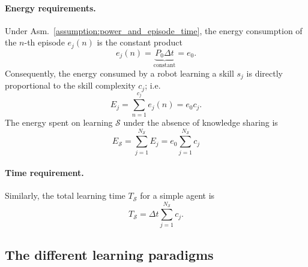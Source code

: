 \paragraph{Energy requirements.}
Under Asm.~\ref{assumption:power_and_episode_time}, the energy consumption of the $n$-th episode $e_j(n)$ is the constant product
\begin{equation}\label{eq:energy_per_episode}
	e_j(n) = \underbrace{P_0 \Delta t}_{\text{constant}} = e_0.
\end{equation}
Consequently, the energy consumed by a robot learning a skill $ s_j $ is directly proportional to the skill complexity $c_j$; i.e.
\begin{equation}\label{eq:energy_per_skill}
	E_j =\sum_{n=1}^{c_j} e_j(n) = e_0c_j.
\end{equation}
The energy spent on learning $\mathcal{S}$ under the absence of knowledge sharing is
\begin{equation}\label{eq:total_energy}
	E_{\mathcal{S}} = \sum_{j=1}^{{N_{\mathcal{S}}}} E_j = e_0 \sum_{j=1}^{{N_{\mathcal{S}}}} c_j%
\end{equation}
\paragraph{Time requirement.} Similarly, the total learning time $T_{\mathcal{S}}$ for a simple agent is
\begin{equation}\label{eq:total_time}
	T_{\mathcal{S}} = \Delta t \sum_{j=1}^{{N_{\mathcal{S}}}} c_j.
\end{equation}

\subsection{The different learning paradigms}\label{sec:types_of_learning}

